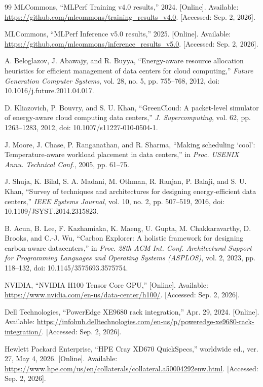 \documentclass[final,3p,12pt,nopreprintline]{elsarticle}
\begin{document}
\begin{thebibliography}{99}
\label{ref:10}
MLCommons, ``MLPerf Training v4.0 results,'' 2024. [Online]. Available: \url{https://github.com/mlcommons/training_results_v4.0}. [Accessed: Sep. 2, 2026].

\label{ref:11}
MLCommons, ``MLPerf Inference v5.0 results,'' 2025. [Online]. Available: \url{https://github.com/mlcommons/inference_results_v5.0}. [Accessed: Sep. 2, 2026].

\label{ref:12}
A. Beloglazov, J. Abawajy, and R. Buyya, ``Energy-aware resource allocation heuristics for efficient management of data centers for cloud computing,'' \emph{Future Generation Computer Systems}, vol. 28, no. 5, pp. 755--768, 2012, doi: 10.1016/j.future.2011.04.017.

\label{ref:13}
D. Kliazovich, P. Bouvry, and S. U. Khan, ``GreenCloud: A packet-level simulator of energy-aware cloud computing data centers,'' \emph{J. Supercomputing}, vol. 62, pp. 1263--1283, 2012, doi: 10.1007/s11227-010-0504-1.

\label{ref:14}
J. Moore, J. Chase, P. Ranganathan, and R. Sharma, ``Making scheduling `cool': Temperature-aware workload placement in data centers,'' in \emph{Proc. USENIX Annu. Technical Conf.}, 2005, pp. 61--75.

\label{ref:15}
J. Shuja, K. Bilal, S. A. Madani, M. Othman, R. Ranjan, P. Balaji, and S. U. Khan, ``Survey of techniques and architectures for designing energy-efficient data centers,'' \emph{IEEE Systems Journal}, vol. 10, no. 2, pp. 507--519, 2016, doi: 10.1109/JSYST.2014.2315823.

\label{ref:16}
B. Acun, B. Lee, F. Kazhamiaka, K. Maeng, U. Gupta, M. Chakkaravarthy, D. Brooks, and C.-J. Wu, ``Carbon Explorer: A holistic framework for designing carbon-aware datacenters,'' in \emph{Proc. 28th ACM Int. Conf. Architectural Support for Programming Languages and Operating Systems (ASPLOS)}, vol. 2, 2023, pp. 118--132, doi: 10.1145/3575693.3575754.

\label{ref:17}
NVIDIA, ``NVIDIA H100 Tensor Core GPU,'' [Online]. Available: \url{https://www.nvidia.com/en-us/data-center/h100/}. [Accessed: Sep. 2, 2026].

\label{ref:18}
Dell Technologies, ``PowerEdge XE9680 rack integration,'' Apr. 29, 2024. [Online]. Available: \url{https://infohub.delltechnologies.com/en-us/p/poweredge-xe9680-rack-integration/}. [Accessed: Sep. 2, 2026].

\label{ref:19}
Hewlett Packard Enterprise, ``HPE Cray XD670 QuickSpecs,'' worldwide ed., ver. 27, May 4, 2026. [Online]. Available: \url{https://www.hpe.com/us/en/collaterals/collateral.a50004292enw.html}. [Accessed: Sep. 2, 2026].

\end{thebibliography}
\end{document}
